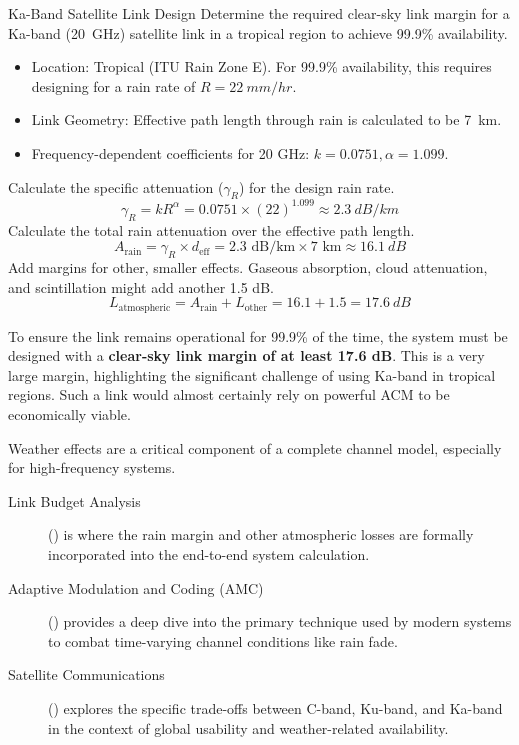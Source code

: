 \begin{workedexample}{Ka-Band Satellite Link Design}
     Determine the required clear-sky link margin for a Ka-band (\qty{20}{GHz}) satellite link in a tropical region to achieve 99.9\% availability.
    \begin{itemize}
        \item Location: Tropical (ITU Rain Zone E). For 99.9\% availability, this requires designing for a rain rate of $R = \qty{22}{mm/hr}$.
        \item Link Geometry: Effective path length through rain is calculated to be \qty{7}{km}.
        \item Frequency-dependent coefficients for 20 GHz: $k=0.0751, \alpha=1.099$.
    \end{itemize}
    \begin{derivationsteps}
        \step Calculate the specific attenuation ($\gamma_R$) for the design rain rate.
        \[ \gamma_R = k R^{\alpha} = 0.0751 \times (22)^{1.099} \approx \qty{2.3}{dB/km} \]
        \step Calculate the total rain attenuation over the effective path length.
        \[ A_{\text{rain}} = \gamma_R \times d_{\text{eff}} = 2.3 \text{ dB/km} \times 7 \text{ km} \approx \qty{16.1}{dB} \]
        \step Add margins for other, smaller effects. Gaseous absorption, cloud attenuation, and scintillation might add another 1.5 dB.
        \[ L_{\text{atmospheric}} = A_{\text{rain}} + L_{\text{other}} = 16.1 + 1.5 = \qty{17.6}{dB} \]
    \end{derivationsteps}
     To ensure the link remains operational for 99.9\% of the time, the system must be designed with a \textbf{clear-sky link margin of at least 17.6 dB}. This is a very large margin, highlighting the significant challenge of using Ka-band in tropical regions. Such a link would almost certainly rely on powerful ACM to be economically viable.
\end{workedexample}


\begin{importantbox}[title={Further Reading}]
    Weather effects are a critical component of a complete channel model, especially for high-frequency systems.
    \begin{description}
        \item[Link Budget Analysis] () is where the rain margin and other atmospheric losses are formally incorporated into the end-to-end system calculation.
        \item[Adaptive Modulation and Coding (AMC)] () provides a deep dive into the primary technique used by modern systems to combat time-varying channel conditions like rain fade.
        \item[Satellite Communications] () explores the specific trade-offs between C-band, Ku-band, and Ka-band in the context of global usability and weather-related availability.
    \end{description}
\end{importantbox}
